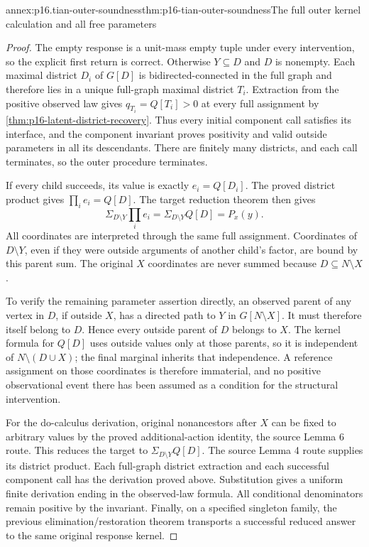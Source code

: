 \begin{annexitem}{annex:p16.tian-outer-soundness}{thm:p16-tian-outer-soundness}{The full outer kernel calculation and all free parameters}
\begin{proof}
The empty response is a unit-mass empty tuple under every intervention,
so the explicit first return is correct. Otherwise \(Y\subseteq D\)
and \(D\) is nonempty. Each maximal district \(D_i\) of
\(G[D]\) is bidirected-connected in the full graph and therefore
lies in a unique full-graph maximal district \(T_i\).
Extraction from the positive observed law gives
\(q_{T_i}=Q[T_i]>0\) at every full assignment by
\cref{thm:p16-latent-district-recovery}. Thus every initial component
call satisfies its interface, and the component invariant proves
positivity and valid outside parameters in all its descendants.
There are finitely many districts, and each call terminates, so
the outer procedure terminates.

If every child succeeds, its value is exactly \(e_i=Q[D_i]\).
The proved district product gives
\(\prod_i e_i=Q[D]\). The target reduction theorem then gives
\[
 \Sigma_{D\setminus Y}\prod_i e_i
   =\Sigma_{D\setminus Y}Q[D]
   =P_x(y).
\]
All coordinates are interpreted through the same full assignment.
Coordinates of \(D\setminus Y\), even if they were outside
arguments of another child's factor, are bound by this parent sum.
The original \(X\) coordinates are never summed because
\(D\subseteq N\setminus X\).

To verify the remaining parameter assertion directly, an observed
parent of any vertex in \(D\), if outside \(X\), has a
directed path to \(Y\) in \(G[N\setminus X]\). It must
therefore itself belong to \(D\). Hence every outside parent
of \(D\) belongs to \(X\). The kernel formula for \(Q[D]\)
uses outside values only at those parents, so it is independent
of \(N\setminus(D\cup X)\); the final marginal inherits that
independence. A reference assignment on those coordinates is
therefore immaterial, and no positive observational event there
has been assumed as a condition for the structural intervention.

For the do-calculus derivation, original nonancestors after \(X\)
can be fixed to arbitrary values by the proved additional-action
identity, the source Lemma 6 route. This reduces the target to
\(\Sigma_{D\setminus Y}Q[D]\). The source Lemma 4 route
supplies its district product. Each full-graph district extraction
and each successful component call has the derivation proved
above. Substitution gives a uniform finite derivation ending in
the observed-law formula. All conditional denominators remain
positive by the invariant. Finally, on a specified singleton family,
the previous elimination/restoration theorem transports a successful
reduced answer to the same original response kernel.
\end{proof}
\end{annexitem}

